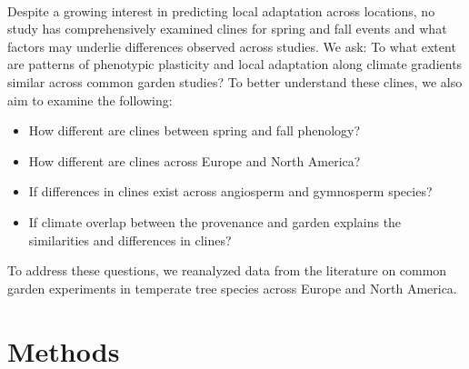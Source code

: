\documentclass{article}
\begin{document}
\\
Despite a growing interest in predicting local adaptation across locations, no study has comprehensively examined clines for spring and fall events and what factors may underlie differences observed across studies. We ask: To what extent are patterns of phenotypic plasticity and local adaptation along climate gradients similar across common garden studies? To better understand these clines, we also aim to examine the following:
\begin{itemize}
\item How different are clines between spring and fall phenology? 
\item How different are clines across Europe and North America?
\item If differences in clines exist across angiosperm and gymnosperm species?
\item If climate overlap between the provenance and garden explains the similarities and differences in clines?
\end{itemize}
To address these questions, we reanalyzed data from the literature on common garden experiments in temperate tree species across Europe and North America. 


\section{Methods}
\end{document}

